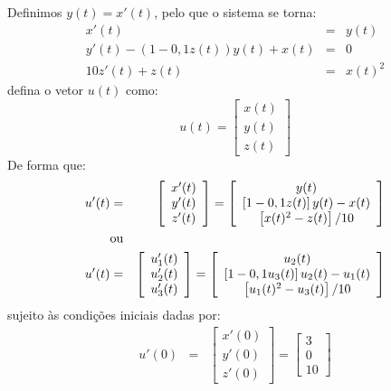 \begin{resol}
 Definimos $y(t)=x'(t)$, pelo que o sistema se torna:
\begin{eqnarray}
x'(t)&=&y(t)\\
y'(t)-(1- 0,1 z(t))y(t)+ x(t)&=&0\\
10 z'(t)+z(t)&=&x(t)^2
\end{eqnarray}
 defina o vetor $u(t)$ como:
\begin{equation}u(t)=\left[
\begin{array}{c}
 x(t)\\y(t)\\z(t)
\end{array}
\right]\end{equation}
De forma que:
\begin{eqnarray}
u'(t)&=&\left[
\begin{array}{c}
 x'(t)\\y'(t)\\z'(t)
\end{array}
\right]=\left[
\begin{array}{c}
 y(t)\\
 \left[1- 0,1 z(t)\right]y(t)- x(t)\\
 \left[x(t)^2-z(t)\right]/10
\end{array}
\right]\\
&\hbox{ou}&\\
u'(t)&=&\left[
\begin{array}{c}
 u_1'(t)\\u_2'(t)\\u_3'(t)
\end{array}
\right]=\left[
\begin{array}{c}
 u_2(t)\\
 \left[1- 0,1 u_3(t)\right]u_2(t)- u_1(t)\\
 \left[u_1(t)^2-u_3(t)\right]/10
\end{array}
\right]
\end{eqnarray}
sujeito às condições iniciais dadas por:
\begin{eqnarray}
u'(0)&=&\left[
\begin{array}{c}
 x'(0)\\y'(0)\\z'(0)
\end{array}
\right]=\left[
\begin{array}{c}
3\\0\\10
\end{array}
\right]
\end{eqnarray}

\end{resol}


